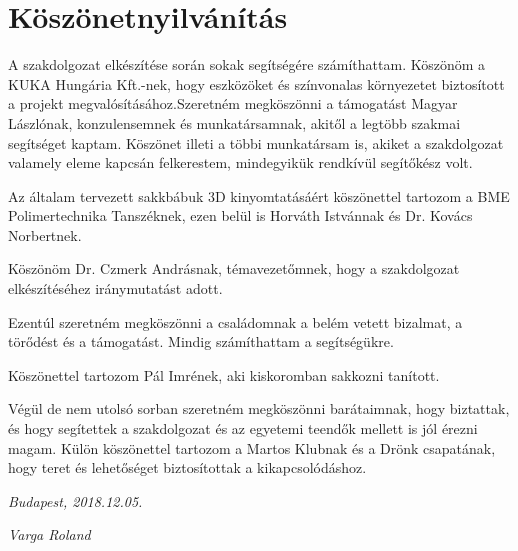 \documentclass[../documentation.tex]{subfiles}
\begin{document}
 \section*{Köszönetnyilvánítás}
 A szakdolgozat elkészítése során sokak segítségére számíthattam. Köszönöm a KUKA Hungária Kft.-nek, hogy eszközöket és színvonalas környezetet biztosított a projekt megvalósításához.Szeretném megköszönni a támogatást Magyar Lászlónak, konzulensemnek és munkatársamnak, akitől a legtöbb szakmai segítséget kaptam. Köszönet illeti a többi munkatársam is, akiket a szakdolgozat valamely eleme kapcsán felkerestem, mindegyikük rendkívül segítőkész volt.

Az általam tervezett sakkbábuk 3D kinyomtatásáért köszönettel tartozom a BME Polimertechnika Tanszéknek, ezen belül is Horváth Istvánnak és Dr. Kovács Norbertnek.

Köszönöm Dr. Czmerk Andrásnak, témavezetőmnek, hogy a szakdolgozat elkészítéséhez iránymutatást adott.

Ezentúl szeretném megköszönni a családomnak a belém vetett bizalmat, a törődést és a támogatást. Mindig számíthattam a segítségükre.

Köszönettel tartozom Pál Imrének, aki kiskoromban sakkozni tanított.

Végül de nem utolsó sorban szeretném megköszönni barátaimnak, hogy biztattak, és hogy segítettek a szakdolgozat és az egyetemi teendők mellett is jól érezni magam. Külön köszönettel tartozom a Martos Klubnak és a Drönk csapatának, hogy teret és lehetőséget biztosítottak a kikapcsolódáshoz.

\vspace{10mm}
\itshape{Budapest, 2018.12.05.}

\vspace{7mm}
\hspace{80mm} \itshape{Varga Roland}
\end{document}
